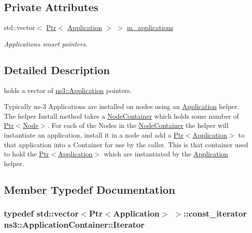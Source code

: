 \subsection*{Private Attributes}
\begin{DoxyCompactItemize}
\item 
std\+::vector$<$ \hyperlink{classns3_1_1Ptr}{Ptr}$<$ \hyperlink{classns3_1_1Application}{Application} $>$ $>$ \hyperlink{classns3_1_1ApplicationContainer_a1b5a21f86d4bf41a40b0ff9b61a33ec7}{m\+\_\+applications}
\begin{DoxyCompactList}\small\item\em Applications smart pointers. \end{DoxyCompactList}\end{DoxyCompactItemize}


\subsection{Detailed Description}
holds a vector of \hyperlink{classns3_1_1Application}{ns3\+::\+Application} pointers. 

Typically ns-\/3 Applications are installed on nodes using an \hyperlink{classns3_1_1Application}{Application} helper. The helper Install method takes a \hyperlink{classns3_1_1NodeContainer}{Node\+Container} which holds some number of \hyperlink{classns3_1_1Ptr}{Ptr$<$\+Node$>$}. For each of the Nodes in the \hyperlink{classns3_1_1NodeContainer}{Node\+Container} the helper will instantiate an application, install it in a node and add a \hyperlink{classns3_1_1Ptr}{Ptr$<$\+Application$>$} to that application into a Container for use by the caller. This is that container used to hold the \hyperlink{classns3_1_1Ptr}{Ptr$<$\+Application$>$} which are instantiated by the \hyperlink{classns3_1_1Application}{Application} helper. 

\subsection{Member Typedef Documentation}
\subsubsection[{\texorpdfstring{Iterator}{Iterator}}]{\setlength{\rightskip}{0pt plus 5cm}typedef std\+::vector$<${\bf Ptr}$<${\bf Application}$>$ $>$\+::const\+\_\+iterator {\bf ns3\+::\+Application\+Container\+::\+Iterator}}\hypertarget{classns3_1_1ApplicationContainer_a46d9e435701ffbca57fff95b97cbf0dc}{}\label{classns3_1_1ApplicationContainer_a46d9e435701ffbca57fff95b97cbf0dc}


